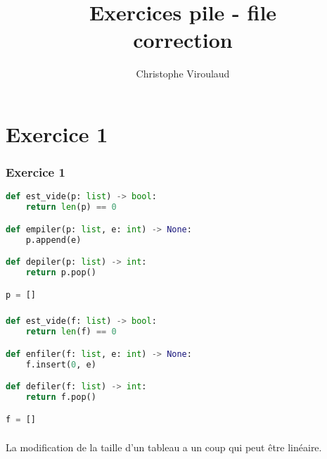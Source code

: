 \documentclass[svgnames,11pt]{beamer}
\author[]{Christophe Viroulaud}
\title{Exercices pile - file\\correction}
\date{\framebox{\textbf{Archi 06}}}
\institute{Terminale - NSI}
\begin{document}
\begin{frame}
    \titlepage
\end{frame}
\section{Exercice 1}
\begin{frame}[fragile]
    \frametitle{Exercice 1}

    \begin{center}
        \begin{lstlisting}[language=Python , basicstyle=\ttfamily\small, xleftmargin=2em, xrightmargin=2em]
def est_vide(p: list) -> bool:
    return len(p) == 0

def empiler(p: list, e: int) -> None:
    p.append(e)

def depiler(p: list) -> int:
    return p.pop()

p = []
\end{lstlisting}
        \label{CODE}
    \end{center}

\end{frame}
\begin{frame}[fragile]
    \frametitle{}

    \begin{center}
        \begin{lstlisting}[language=Python , basicstyle=\ttfamily\small, xleftmargin=2em, xrightmargin=2em]
def est_vide(f: list) -> bool:
    return len(f) == 0

def enfiler(f: list, e: int) -> None:
    f.insert(0, e)

def defiler(f: list) -> int:
    return f.pop()

f = []
\end{lstlisting}
        \label{CODE}
    \end{center}

\end{frame}
\begin{frame}
    \frametitle{}

    La modification de la taille d'un tableau a un coup qui peut être linéaire.

\end{frame}
\end{document}
